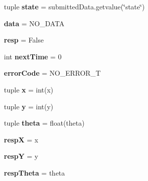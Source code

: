 \begin{DoxyCompactItemize}
\item 
\hypertarget{namespacerobot_server_a9dc9db166574d681e1d005d3560b29ed}{tuple {\bfseries state} = submitted\+Data.\+getvalue(\char`\"{}state\char`\"{})}\label{namespacerobot_server_a9dc9db166574d681e1d005d3560b29ed}

\item 
\hypertarget{namespacerobot_server_ab28107f53bc5e7623fb27e6f510305df}{{\bfseries data} = N\+O\+\_\+\+D\+A\+T\+A}\label{namespacerobot_server_ab28107f53bc5e7623fb27e6f510305df}

\item 
\hypertarget{namespacerobot_server_adf782794f4405bb365f1d3a20b6f7616}{{\bfseries resp} = False}\label{namespacerobot_server_adf782794f4405bb365f1d3a20b6f7616}

\item 
\hypertarget{namespacerobot_server_a03d5c206b511455579ec1a28fdc063ff}{int {\bfseries next\+Time} = 0}\label{namespacerobot_server_a03d5c206b511455579ec1a28fdc063ff}

\item 
\hypertarget{namespacerobot_server_a390ec09ce739645fc27d3d61fbda14ab}{{\bfseries error\+Code} = N\+O\+\_\+\+E\+R\+R\+O\+R\+\_\+\+T}\label{namespacerobot_server_a390ec09ce739645fc27d3d61fbda14ab}

\item 
\hypertarget{namespacerobot_server_afabbe7f5b75a08e6671092f656ed3c04}{tuple {\bfseries x} = int(x)}\label{namespacerobot_server_afabbe7f5b75a08e6671092f656ed3c04}

\item 
\hypertarget{namespacerobot_server_a69dc665847466075934352088629aa2e}{tuple {\bfseries y} = int(y)}\label{namespacerobot_server_a69dc665847466075934352088629aa2e}

\item 
\hypertarget{namespacerobot_server_acd0817d2086ea4a8c11a607667bb4105}{tuple {\bfseries theta} = float(theta)}\label{namespacerobot_server_acd0817d2086ea4a8c11a607667bb4105}

\item 
\hypertarget{namespacerobot_server_a7e9e01885d720ea75b08a46f91a8e73f}{{\bfseries resp\+X} = x}\label{namespacerobot_server_a7e9e01885d720ea75b08a46f91a8e73f}

\item 
\hypertarget{namespacerobot_server_a19f3fbdd0e7fdda8dad211bda5398b5a}{{\bfseries resp\+Y} = y}\label{namespacerobot_server_a19f3fbdd0e7fdda8dad211bda5398b5a}

\item 
\hypertarget{namespacerobot_server_ad0456f5a4216a5bcccb79365cc003d6f}{{\bfseries resp\+Theta} = theta}\label{namespacerobot_server_ad0456f5a4216a5bcccb79365cc003d6f}

\end{DoxyCompactItemize}


